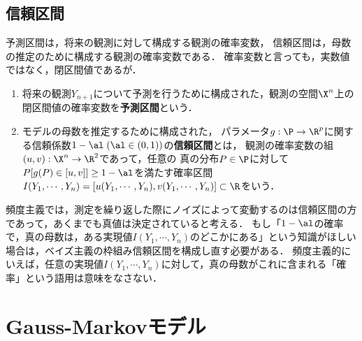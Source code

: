 \documentclass[uplatex,dvipdfmx]{jsreport}
\begin{document}
\subsection{信頼区間}

\begin{tcolorbox}[colframe=ForestGreen, colback=ForestGreen!10!white,breakable,colbacktitle=ForestGreen!40!white,coltitle=black,fonttitle=\bfseries\sffamily,
title=]
    予測区間は，将来の観測に対して構成する観測の確率変数，
    信頼区間は，母数の推定のために構成する観測の確率変数である．
    確率変数と言っても，実数値ではなく，閉区間値であるが．
\end{tcolorbox}

\begin{definition}\mbox{}
    \begin{enumerate}
        \item 将来の観測$Y_{n+1}$について予測を行うために構成された，観測の空間$\X^n$上の閉区間値の確率変数を\textbf{予測区間}という．
        \item モデルの母数を推定するために構成された，
        パラメータ$g:\P\to\R^p$に関する信頼係数$1-\al\;(\al\in(0,1))$の\textbf{信頼区間}とは，
        観測の確率変数の組$(u,v):\X^n\to\R^2$であって，任意の
        真の分布$P\in\P$に対して$P[g(P)\in[u,v]]\ge1-\al$を満たす確率区間$I(Y_1,\cdots,Y_n)=[u(Y_1,\cdots,Y_n),v(Y_1,\cdots,Y_n)]\subset\R$をいう．
    \end{enumerate}
\end{definition}
\begin{remarks}
    頻度主義では，測定を繰り返した際にノイズによって変動するのは信頼区間の方であって，あくまでも真値は決定されていると考える．
    もし「$1-\al$の確率で，真の母数は，ある実現値$I(Y_1,\cdots,Y_n)$のどこかにある」という知識がほしい場合は，ベイズ主義の枠組み信頼区間を構成し直す必要がある．
    頻度主義的にいえば，任意の実現値$I(Y_1,\cdots,Y_n)$に対して，真の母数がこれに含まれる「確率」という語用は意味をなさない．
\end{remarks}

\section{Gauss-Markovモデル}
\end{document}
